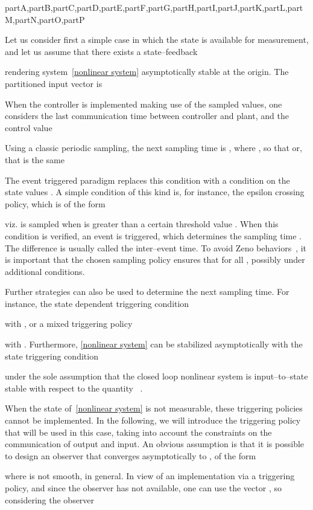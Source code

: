\documentclass[letterpaper, 10 pt, conference]{ieeeconf}
\def\compile{partA,partB,partC,partD,partE,partF,partG,partH,partI,partJ,partK,partL,partM,partN,partO,partP}
\begin{document}
\begin{xcomment}{\compile}
\begin{partC}
Let us consider first a simple case in which the state  is available for measurement, and let us assume that there exists a state--feedback 

rendering system~\eqref{nonlinear system} asymptotically stable at the origin. The partitioned input vector is 

When the controller is implemented making use of the sampled values, one considers the last communication time  between controller and plant, and the control value



Using a classic periodic sampling, the next sampling time is , where , so that  or, that is the same

The event triggered paradigm replaces this condition with a condition on the state values . A simple condition of this kind is, for instance, the epsilon crossing policy, which is of the form

viz.  is sampled when  is greater than a certain threshold value . When this condition is verified, an event is triggered, which determines the sampling time . The difference  is usually called the inter--event time. To avoid Zeno behaviors~\cite{Johansson 1999}, it is important that the chosen sampling policy ensures that  for all , possibly under additional conditions.

Further strategies can also be used to determine the next sampling time. For instance, the state dependent triggering condition

with , or a mixed triggering policy 

with . Furthermore, \eqref{nonlinear system} can be stabilized asymptotically with the state triggering condition 
 
under the sole assumption that the closed loop nonlinear system is input--to--state stable with respect to the quantity ~\cite{Tabuada 2007}.


When the state  of~\eqref{nonlinear system} is not measurable, these triggering policies cannot be implemented. In the following, we will introduce the triggering policy that will be used in this case, taking into account the constraints on the communication of output and input. An obvious assumption is that it is possible to design an observer that converges asymptotically to , of the form  

where  is not smooth, in general. In view of an implementation via a triggering policy, and since the observer has not  available, one can use the vector , so considering the observer



\end{partC}
\end{xcomment}
\end{document}
